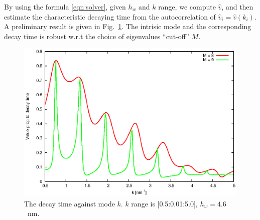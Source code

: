 \documentclass[aip,jcp,a4paper,reprint,onecolumn]{revtex4-1}
\begin{document}
\noindent
By using the formula \eqref{eqn:solver}, given $h_w$ and $k$ range,
we compute $\hat v$, and then estimate the characteristic decaying time from the autocorrelation of $\hat v_i = \hat v(k_i)$.
A preliminary result is given in Fig.~\ref{fig:tmp1}. The intrisic mode and the corresponding decay time is robust w.r.t the choice of eigenvalues ``cut-off'' $M$.
\begin{figure}
  \centering
  \includegraphics[]{tau.eps}
  \caption{The decay time against mode $k$.
  $k$ range is [0.5:0.01:5.0], $h_w=4.6$~nm.}
  \label{fig:tmp1}
\end{figure}
\end{document}
